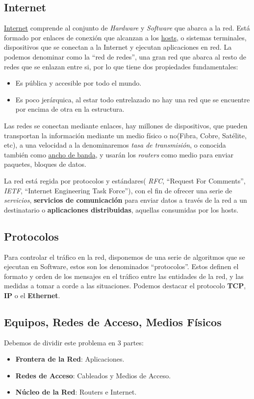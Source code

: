 \subsection{Internet}
\noindent \underline{Internet} comprende al conjunto de \textit{Hardware} y \textit{Software} que abarca a la red. Está formado por enlaces de conexión que alcanzan a los \underline{hosts}, o sistemas terminales, dispositivos que se conectan a la Internet y ejecutan aplicaciones en red. La podemos denominar como la ``red de redes'', una gran red que abarca al resto de redes que se enlazan entre si, por lo que tiene dos propiedades fundamentales:
\begin{itemize}
        \item Es pública y accesible por todo el mundo.
        \item Es poco jerárquica, al estar todo entrelazado no hay una red que se encuentre por encima de otra en la estructura.
\end{itemize}
\noindent Las redes se conectan mediante enlaces, hay millones de dispositivos, que pueden transportan la información mediante un medio físico o no(Fibra, Cobre, Satélite, etc), a una velocidad a la denominaremos \textit{tasa de transmisión}, o conocida también como \underline{ancho de banda}, y usarán los \textit{routers} como medio para enviar paquetes, bloques de datos.
\par \noindent La red está regida por protocolos y estándares( \textit{RFC}, ``Request For Comments'', \textit{IETF}, ``Internet Engineering Task Force''), con el fin de ofrecer una serie de \textit{servicios}, \textbf{servicios de comunicación} para enviar datos a través de la red a un destinatario o \textbf{aplicaciones distribuidas}, aquellas consumidas por los hosts.
\subsection{Protocolos}
\noindent Para controlar el tráfico en la red, disponemos de una serie de algoritmos que se ejecutan en Software, estos son los denominados ``protocolos''. Estos definen el formato y orden de los mensajes en el tráfico entre las entidades de la red, y las medidas a tomar a corde a las situaciones. Podemos destacar el protocolo \textbf{TCP}, \textbf{IP} o el \textbf{Ethernet}.
\subsection{Equipos, Redes de Acceso, Medios Físicos}
\noindent Debemos de dividir este problema en 3 partes:
\begin{itemize}
        \item \textbf{Frontera de la Red}: Aplicaciones.
        \item \textbf{Redes de Acceso}: Cableados y Medios de Acceso.
        \item \textbf{Núcleo de la Red}: Routers e Internet.
\end{itemize}
